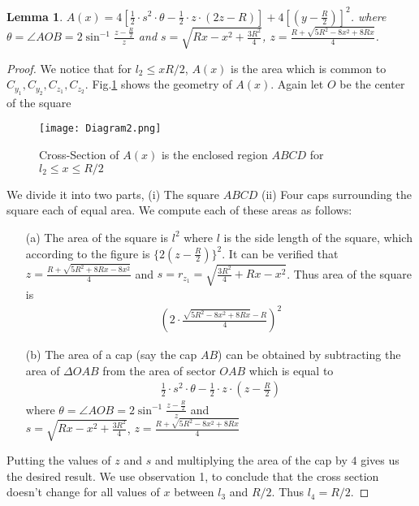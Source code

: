 \documentclass[conference]{IEEEtran}
\newtheorem{lemma}{Lemma}
\begin{document}
\begin{lemma}
$A(x) = 4\left[\frac{1}{2}\cdot s^2\cdot \theta - \frac{1}{2} \cdot z \cdot (2z - R)\right] + 
4\left[(y - \frac{R}{2})\right]^2$.
where $\theta = \angle AOB = 2\sin^{-1}\frac{z-\frac{R}{2}}{z}$ and $s = \sqrt{Rx - x^2 + \frac{3R^2}{4}}$, $z =  \frac{R + \sqrt{5R^2 - 8x^2 + 8Rx}}{4}$.
\end{lemma}
\begin{proof}
We notice that for $l_2 \leq x R/2$, $A(x)$ is the area which is common to $C_{y_1} , C_{y_2},  C_{z_1}, C_{z_2}$. Fig.\ref{z7} shows the geometry of $A(x)$. Again let $O$ be the center of the square
\begin{figure}
\centering
\texttt{[image: Diagram2.png]}
\caption{Cross-Section of $A(x)$ is the enclosed region $ABCD$ for $l_2 \leq x \leq R/2$}
\label{z7}
\end{figure}
We divide it into two parts, (i) The square $ABCD$ (ii) Four caps surrounding the square each of equal area. We compute
each of these areas as follows:
\begin{itemize}
\item[(a)] The area of the square is $l^2$ where $l$ is the side length of the square, which according to the figure is $\{2\left(z-\frac{R}{2}\right)\}^2$. It
can be verified that $z = \frac{R + \sqrt{5R^2 + 8Rx - 8x^2}}{4}$ and $s = r_{z_1} = \sqrt{\frac{3R^2}{4} + Rx -x^2}$. Thus area of the square is
\begin{eqnarray*}
\left(2 \cdot \frac{\sqrt{5R^2 - 8x^2 + 8Rx}- R}{4}\right)^2
\end{eqnarray*}

\item[(b)] The area of a cap (say the cap $AB$) can be obtained by subtracting the area of $\Delta OAB$ from the area of sector $OAB$
which is equal to
\begin{eqnarray*}
\frac{1}{2}\cdot s^2\cdot \theta - \frac{1}{2} \cdot z \cdot (z - \frac{R}{2})
\end{eqnarray*}
where $\theta = \angle AOB = 2\sin^{-1}\frac{z-\frac{R}{2}}{z}$ and \\
 $s = \sqrt{Rx - x^2 + \frac{3R^2}{4}}$, $z =  \frac{R + \sqrt{5R^2 - 8x^2 + 8Rx}}{4} $ 

\end{itemize}
Putting the values of $z$ and $s$ and multiplying the area of the cap by $4$ gives us the desired result.
We use observation 1, to conclude that the cross section doesn't change for all values  of $x$ between $l_3$
and $R/2$. Thus $l_4 = R/2$.
\end{proof}
\end{document}
